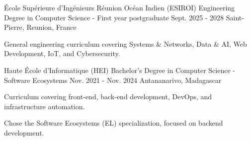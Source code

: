 

\begin{cventries}

  \cventry    
    {\'Ecole Supérieure d'Ingénieurs Réunion Océan Indien (ESIROI)} %
    {Engineering Degree in Computer Science - First year postgraduate} %
    {Sept. 2025 - 2028} %
    {Saint-Pierre, Reunion, France} %
    {
      \begin{cvitems} %
        \item {General engineering curriculum covering Systems \& Networks, Data \& AI, Web Development, IoT, and Cybersecurity.}
      \end{cvitems}
    }

  \cventry
    {Haute \'Ecole d'Informatique (HEI)} %
    {Bachelor's Degree in Computer Science - Software Ecosystems} %
    {Nov. 2021 - Nov. 2024} %
    {Antananarivo, Madagascar} %
    {
      \begin{cvitems} %
        \item {Curriculum covering front-end, back-end development, DevOps, and infrastructure automation.}
        \item {Chose the Software Ecosystems (EL) specialization, focused on backend development.}
      \end{cvitems}
    }

\end{cventries}